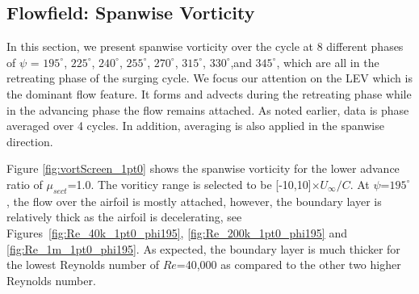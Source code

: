 \subsection{Flowfield: Spanwise Vorticity}

In this section, we present spanwise vorticity over the cycle at 8 different phases of $\psi$ = $195^\circ$, $225^\circ$, $240^\circ$, $255^\circ$, $270^\circ$, $315^\circ$, $330^\circ$,and $345^\circ$, which are all in the retreating phase of the surging cycle.
We focus our attention on the LEV which is the dominant flow feature.
It forms and advects during the retreating phase while in the advancing phase the flow remains attached.
As noted earlier, data is phase averaged over 4 cycles.
In addition, averaging is also applied in the spanwise direction.

Figure \ref{fig:vortScreen_1pt0} shows the spanwise vorticity for the lower advance ratio of $\mu_{sect}$=1.0.
The voriticy range is selected to be [-10,10]$\times U_\infty /C$.
At $\psi$=$195^\circ$, the flow over the airfoil is mostly attached, however, the boundary layer is relatively thick as the airfoil is decelerating, see Figures~\ref{fig:Re_40k_1pt0_phi195}, \ref{fig:Re_200k_1pt0_phi195} and \ref{fig:Re_1m_1pt0_phi195}.
As expected, the boundary layer is much thicker for the lowest Reynolds number of $Re$=40,000 as compared to the other two higher Reynolds number.

